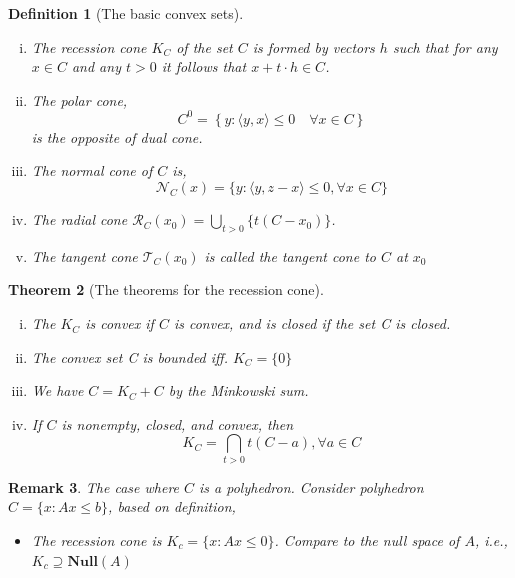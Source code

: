 \documentclass{beamerswitch}
\newtheorem{thm}{Theorem}[section]
\newtheorem{defn}[thm]{Definition}
\newtheorem{remark}[thm]{Remark}
\begin{document}
\begin{defn}[The basic convex sets]

    \begin{enumerate}[(i)]
        \item The recession cone \(K_C\) of the set \(C\) is formed by vectors \(h\) such that for any \(x \in C\) and any \(t > 0\) it follows that \(x + t\cdot h \in C\).
        \item The polar cone,
              \begin{equation}C^{0}=\left\{y:\langle y, x\rangle \leq 0 \quad \forall x \in C\right\}
              \end{equation}
              is the opposite of dual cone.
        \item The normal cone of \(C\) is,
              \begin{equation}
                  \mathcal N_C(x) = \{y: \langle y,  z-x \rangle \le 0, \forall x \in C\}
              \end{equation}
        \item The radial cone \(\mathcal R_C(x_0) = \bigcup_{t>0}\{ t(C - x_0) \}\).
        \item The tangent cone \(\mathcal T_C(x_0)\) is called the tangent cone to \(C\) at \(x_0\)
    \end{enumerate}

\end{defn}
\begin{thm}[The theorems for the recession cone]

    \begin{enumerate}[(i)]
        \item The \(K_C\) is convex if \(C\) is convex, and is closed if the set C is closed.
        \item The convex set C is bounded iff. \(K_C = \{0\}\)
        \item We have \(C = K_C + C\) by the Minkowski sum.
        \item If \(C\) is nonempty, closed, and convex, then
              \[K_C = \bigcap_{t> 0} t(C-a), \forall a \in C\]
    \end{enumerate}
\end{thm}

\begin{remark} The case where \(C\) is a polyhedron.
    Consider polyhedron \(C = \{x: Ax \le b\}\), based on definition,
    \begin{itemize}
        \item The recession cone is \(K_c = \{x: Ax \le 0\}\). Compare to the null space of \(A\), i.e., \(K_c \supseteq \mathbf{Null}(A)\)
    \end{itemize}
\end{remark}
\end{document}
